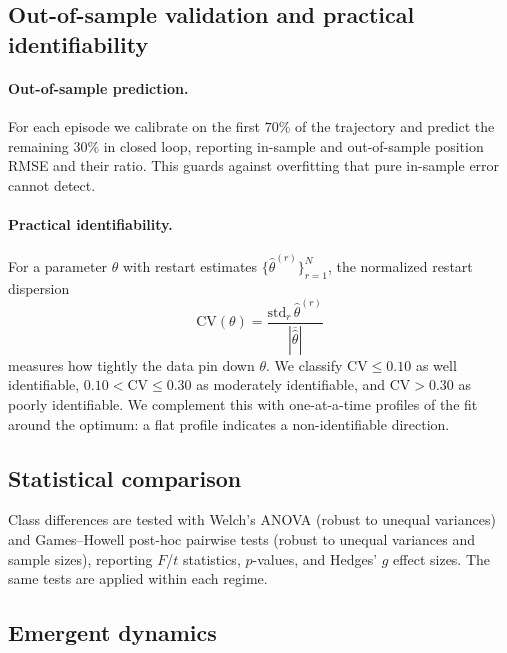 \documentclass[11pt]{article}
\begin{document}
\subsection{Out-of-sample validation and practical identifiability}
\label{sec:ident}
\paragraph{Out-of-sample prediction.} For each episode we calibrate on the first
$70\%$ of the trajectory and predict the remaining $30\%$ in closed loop,
reporting in-sample and out-of-sample position RMSE and their ratio. This guards
against overfitting that pure in-sample error cannot detect.

\paragraph{Practical identifiability.} For a parameter $\theta$ with restart
estimates $\{\hat\theta^{(r)}\}_{r=1}^{N}$, the normalized restart dispersion
\begin{equation}
\mathrm{CV}(\theta)=\frac{\mathrm{std}_r\,\hat\theta^{(r)}}{|\overline{\hat\theta}|}
\label{eq:cv}
\end{equation}
measures how tightly the data pin down $\theta$. We classify
$\mathrm{CV}\le0.10$ as well identifiable, $0.10<\mathrm{CV}\le0.30$ as
moderately identifiable, and $\mathrm{CV}>0.30$ as poorly identifiable. We
complement this with one-at-a-time profiles of the fit around the optimum: a flat
profile indicates a non-identifiable direction.

\subsection{Statistical comparison}
Class differences are tested with Welch's ANOVA (robust to unequal variances) and
Games--Howell post-hoc pairwise tests (robust to unequal variances and sample
sizes), reporting $F$/$t$ statistics, $p$-values, and Hedges' $g$ effect sizes.
The same tests are applied within each regime.

\subsection{Emergent dynamics}
\label{sec:emergent}
\end{document}
